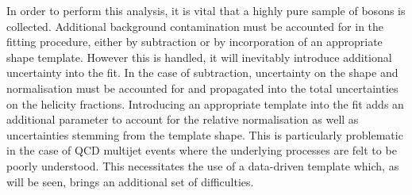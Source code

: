 In order to perform this analysis, it is vital that a highly pure sample of \PW
bosons is collected. Additional background contamination must be accounted for
in the fitting procedure, either by subtraction or by incorporation of an
appropriate shape template. However this is handled, it will inevitably
introduce additional uncertainty into the fit. In the case of subtraction,
uncertainty on the shape and normalisation must be accounted for and propagated
into the total uncertainties on the helicity fractions. Introducing an
appropriate template into the fit adds an additional parameter to account for
the relative normalisation as well as uncertainties stemming from the template
shape. This is particularly problematic in the case of \ac{QCD} multijet events
where the underlying processes are felt to be poorly understood. This
necessitates the use of a data-driven template which, as will be seen, brings an
additional set of difficulties.

